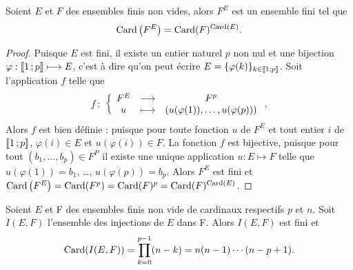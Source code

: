 \begin{theo}
  Soient $E$ et $F$ des ensembles finis non vides, alors $F^E$ est un ensemble fini tel que
  \begin{equation}
    \operatorname{Card}\left(F^E\right)=\operatorname{Card}(F)^{\operatorname{Card}(E)}.
  \end{equation}
\end{theo}
\begin{proof}
  Puisque $E$ est fini, il existe un entier naturel $p$ non nul et une bijection $\varphi:\mathopen{\llbracket}1\mathclose{}\mathpunct{};p\mathclose{\rrbracket} \longmapsto E$, c'est à dire qu'on peut écrire $E=\{\varphi(k)\}_{k\in\mathopen{\llbracket}1\mathclose{}\mathpunct{};p\mathclose{\rrbracket}}$. Soit l'application $f$ telle que
  \begin{equation}
    f\colon \left\{\begin{array}{ccc} F^E & \longrightarrow &F^p\\ u & \longmapsto & (u(\varphi(1)), \ldots, u(\varphi(p))) \end{array} \right..
  \end{equation}
  Alors $f$ est bien définie : puisque pour toute fonction $u$ de $F^E$ et tout entier $i$ de $\mathopen{\llbracket}1\mathclose{}\mathpunct{};p\mathclose{\rrbracket}$, $\varphi(i) \in E$ et $u(\varphi(i))\in F$. La fonction $f$ est bijective, puisque pour tout $(b_1, \ldots, b_p) \in F^P$ il existe une unique application $u:E\longmapsto F$ telle que $u(\varphi(1))=b_1$, \ldots, $u(\varphi(p))=b_p$. Alors $F^E$ est fini et $\operatorname{Card}\left(F^E\right)=\operatorname{Card}(F^p)=\operatorname{Card}(F)^p=\operatorname{Card}(F)^{\operatorname{Card}(E)}$.
\end{proof}
\begin{prop}\label{prop:nbinj}
  Soient $E$ et F des ensembles finis non vide de cardinaux respectifs $p$ et $n$. Soit $I(E,F)$ l'ensemble des injections de $E$ dans F. Alors $I(E,F)$ est fini et
  \begin{equation}
    \operatorname{Card}(I(E,F))=\prod_{k=0}^{p-1}(n-k)=n(n-1) \dotsm (n-p+1).
  \end{equation}
\end{prop}
